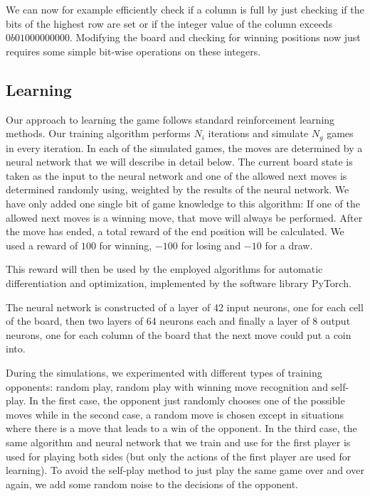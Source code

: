 \documentclass[10pt,twocolumn,letterpaper]{article}
\begin{document}
We can now for example efficiently check if a column is full by just checking if the bits of the highest row are set or if the integer value of the column exceeds $0b01000000000$.
Modifying the board and checking for winning positions now just requires some simple bit-wise operations on these integers.

\subsection{Learning}
Our approach to learning the game follows standard reinforcement learning methods.
Our training algorithm performs $N_i$ iterations and simulate $N_g$ games in every iteration.
In each of the simulated games, the moves are determined by a neural network that we will describe in detail below.
The current board state is taken as the input to the neural network and one of the allowed next moves is determined randomly using, weighted by the results of the neural network.
We have only added one single bit of game knowledge to this algorithm: If one of the allowed next moves is a winning move, that move will always be performed.
After the move has ended, a total reward of the end position will be calculated.
We used a reward of $100$ for winning, $-100$ for losing and $-10$ for a draw.

This reward will then be used by the employed algorithms for automatic differentiation and optimization\cite{Adam}, implemented by the software library PyTorch\cite{PyTorch}.

The neural network is constructed of a layer of 42 input neurons, one for each cell of the board, then two layers of 64 neurons each and finally a layer of 8 output neurons, one for each column of the board that the next move could put a coin into.

During the simulations, we experimented with different types of training opponents: random play, random play with winning move recognition and self-play.
In the first case, the opponent just randomly chooses one of the possible moves while in the second case, a random move is chosen except in situations where there is a move that leads to a win of the opponent.
In the third case, the same algorithm and neural network that we train and use for the first player is used for playing both sides (but only the actions of the first player are used for learning).
To avoid the self-play method to just play the same game over and over again, we add some random noise to the decisions of the opponent.
\end{document}
